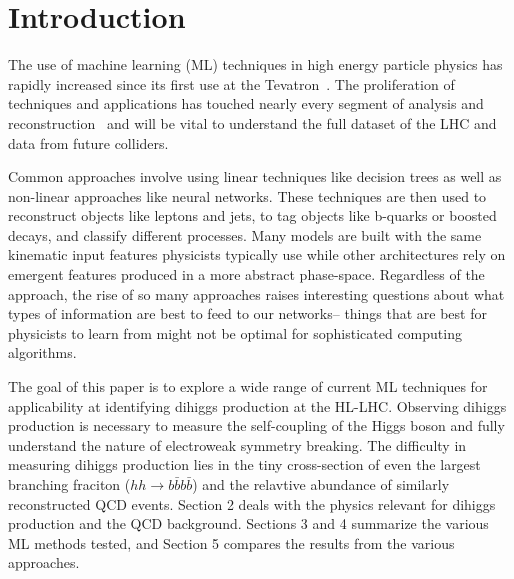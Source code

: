 \section{Introduction}
\label{sec:intro}

The use of machine learning (ML) techniques in high energy particle physics has rapidly increased since its first use at the Tevatron~\cite{Abazov_2009}. The proliferation of techniques and applications has touched nearly every segment of analysis and reconstruction~\cite{albertsson2018machine} and will be vital to understand the full dataset of the LHC and data from future colliders.

Common approaches involve using linear techniques like decision trees as well as non-linear approaches like neural networks. These techniques are then used to reconstruct objects like leptons and jets, to tag objects like b-quarks or boosted decays, and classify different processes. Many models are built with the same kinematic input features physicists typically use while other architectures rely on emergent features produced in a more abstract phase-space. Regardless of the approach, the rise of so many approaches raises interesting questions about what types of information are best to feed to our networks-- things that are best for physicists to learn from might not be optimal for sophisticated computing algorithms.

The goal of this paper is to explore a wide range of current ML techniques for applicability at identifying dihiggs production at the HL-LHC. Observing dihiggs production is necessary to measure the self-coupling of the Higgs boson and fully understand the nature of electroweak symmetry breaking. The difficulty in measuring dihiggs production lies in the tiny cross-section of even the largest branching fraciton ($hh\rightarrow b\bar{b}b\bar{b}$) and the relavtive abundance of similarly reconstructed QCD events. Section 2 deals with the physics relevant for dihiggs production and the QCD background. Sections 3 and 4 summarize the various ML methods tested, and Section 5 compares the results from the various approaches.
